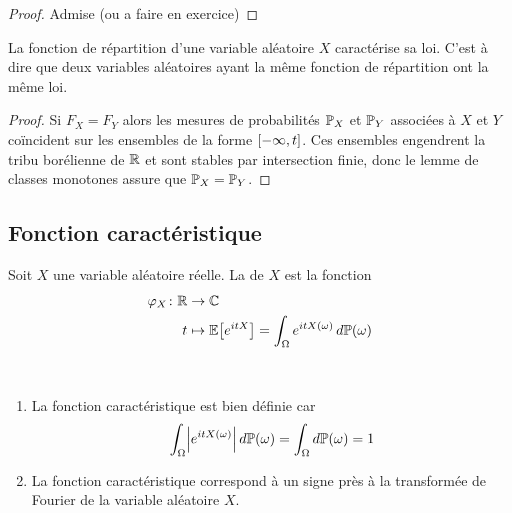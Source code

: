 \begin{proof}
    Admise (ou a faire en exercice)
\end{proof}

\begin{proposition}
    La fonction de répartition d'une variable aléatoire \(X\) caractérise sa loi. C'est à dire que deux variables
    aléatoires ayant la même fonction de répartition ont la même loi.
\end{proposition}

\begin{proof}
    Si \(F_X = F_Y\) alors
    les mesures de probabilités \(\mathbb{P}_X\) et \(\mathbb{P}_Y\) associées à \(X\) et \(Y\) coïncident sur les
    ensembles de la forme \(\mathopen{}\left[-\infty,t\right]\mathclose{}\). Ces ensembles engendrent la tribu borélienne de \(\mathbb{R}\) et
    sont stables par intersection finie, donc le lemme de classes monotones assure que \(\mathbb{P}_X = \mathbb{P}_Y\).
\end{proof}

\subsection{Fonction caractéristique}

\begin{definition}
    Soit \(X\) une variable aléatoire réelle. La  de \(X\) est la fonction
    \begin{equation*}
        \begin{aligned}
            \varphi_X\colon \mathbb{R} &\to\mathbb{C}\\
            t &\mapsto \mathbb{E}\mathopen{}\left[e^{itX}\right]\mathclose{} = \int_{\Omega} e^{itX(\omega)}\mathop{}\!{d}\mathbb{P}(\omega)
        \end{aligned}
    \end{equation*}
\end{definition}

\begin{remark}\,
    \begin{enumerate}
        \item La fonction caractéristique est bien définie car
        \begin{equation*}
            \int_{\Omega}\mathopen{}\left|e^{itX(\omega)}\right|\mathclose{}\mathop{}\!{d}\mathbb{P}(\omega) = \int_{\Omega} \mathop{}\!{d}\mathbb{P}(\omega) = 1
        \end{equation*}

        \item La fonction caractéristique correspond à un signe près à la transformée de Fourier de la
        variable aléatoire \(X\).
    \end{enumerate}
\end{remark}

